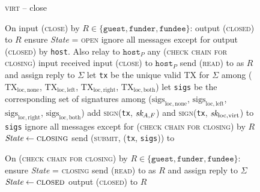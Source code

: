 \begin{figure}[H]
  \begin{processbox}{\textsc{virt} -- close}
    \begin{algorithmic}[1]
      \State On input (\textsc{close}) by $R \in \{\texttt{guest},
      \texttt{funder}, \texttt{fundee}\}$: 
      \Indent
          \State output (\textsc{closed}) to $R$
        \EndIf
        \State ensure \textit{State} = \textsc{open}
         
          \State ignore all messages except for output (\textsc{closed}) by
          \texttt{host}. Also relay to $\texttt{host}_P$ any (\textsc{check
          chain for closing}) input received
          \State input (\textsc{close}) to $\texttt{host}_P$
        \EndIf
        \State {}
        \State send (\textsc{read}) to \ledger as $R$ and assign reply to
        $\Sigma$
        \State let \texttt{tx} be the unique valid TX for $\Sigma$ among
        ($\mathrm{TX}_{\mathrm{loc}, \mathrm{none}}$,
        $\mathrm{TX}_{\mathrm{loc}, \mathrm{left}}$, $\mathrm{TX}_{\mathrm{loc},
        \mathrm{right}}$, $\mathrm{TX}_{\mathrm{loc}, \mathrm{both}}$)
        \State let \texttt{sigs} be the corresponding set of signatures among
        ($\mathrm{sigs}_{\mathrm{loc}, \mathrm{none}}$,
        $\mathrm{sigs}_{\mathrm{loc}, \mathrm{left}}$,
        $\mathrm{sigs}_{\mathrm{loc}, \mathrm{right}}$,
        $\mathrm{sigs}_{\mathrm{loc}, \mathrm{both}}$)
        \State add \textsc{sign}(\texttt{tx}, $\textit{sk}_{A, F}$) and
        \textsc{sign}(\texttt{tx}, $\textit{sk}_{\mathrm{loc}, \mathrm{virt}}$) to
        \texttt{sigs} 
        \State ignore all messages except for (\textsc{check chain for closing})
        by $R$
        \State $\textit{State} \gets \textsc{closing}$
        \State send (\textsc{submit}, (\texttt{tx}, \texttt{sigs})) to \ledger
      \EndIndent
      \Statex

      \State On (\textsc{check chain for closing}) by $R \in \{\texttt{guest},
      \texttt{funder}, \texttt{fundee}\}$:
      \Indent
        \State ensure \textit{State} = \textsc{closing}
        \State send (\textsc{read}) to \ledger as $R$ and assign reply to
        $\Sigma$
         
          \State $\textit{State} \gets \textsc{closed}$
          \State output (\textsc{closed}) to $R$
        \EndIf
      \EndIndent
    \end{algorithmic}
  \end{processbox}
  \caption{}
  \label{code:virtual-layer:close}
\end{figure}
